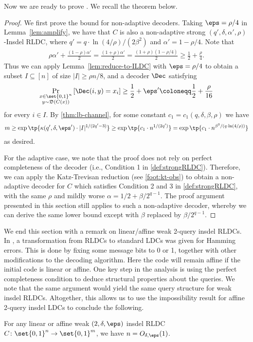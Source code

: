 Now we are ready to prove . We recall the theorem below.
\strirldcmain*
\begin{proof}
We first prove the bound for non-adaptive decoders. Taking $\eps = \rho/4$ in Lemma~\ref{lem:amplify}, we have that $C$ is also a non-adaptive strong $(q',\delta,\alpha', \rho)$-Insdel RLDC, where $q'=q\cdot \ln(4/\rho)/(2\beta^2)$ and $\alpha'=1-\rho/4$. Note that
\begin{align*}
	\rho\alpha' + \frac{(1-\rho)\alpha'}{2} = \frac{(1+\rho)\alpha'}{2} = \frac{(1+\rho)(1-\rho/4)}{2} \ge \frac{1}{2} + \frac{\rho}{4}.
\end{align*}
Thus we can apply Lemma~\ref{lem:reduce-to-ILDC} with $\eps = \rho/4$ to obtain a subset $I\subseteq [n]$ of size $|I| \ge \rho n/8$, and a decoder $\Dec$ satisfying
\begin{align*}
	\Pr_{\substack{x \in \set{0,1}^n \\ y \sim \mathfrak{D}(C(x))}}\left[ \Dec(i, y) = x_i \right] \ge \frac{1}{2} + \eps' \coloneqq \frac{1}{2}+\frac{\rho}{16} 
\end{align*}
for every $i \in I$. By \cref{thm:lb-channel}, for some constant $c_1=c_1(q,\delta,\beta,\rho)$ we have 
\begin{align*}
m \ge \exp\tp{\kappa(q',\delta,\eps') \cdot |I|^{1/(2q'-3)}} \ge \exp\tp{c_1 \cdot n^{1/(2q')}} = \exp\tp{c_1\cdot n^{\beta^2/(q \cdot \ln(4/\rho))}}
\end{align*}
as desired. 

For the adaptive case, we note that the proof does not rely on perfect completeness of the decoder (i.e., Condition 1 in \cref{def:strongRLDC}). Therefore, we can apply the Katz-Trevisan reduction (see \cref{foot:kt-obs}) to obtain a non-adaptive decoder for $C$ which satisfies Condition 2 and 3 in \cref{def:strongRLDC}, with the same $\rho$ and mildly worse $\alpha=1/2+\beta/2^{q-1}$. The proof argument presented in this section still applies to such a non-adaptive decoder, whereby we can derive the same lower bound except with $\beta$ replaced by $\beta/2^{q-1}$.
\end{proof}

We end this section with a remark on linear/affine weak 2-query insdel RLDCs. In , a transformation from RLDCs to standard LDCs was given for Hamming errors. This is done by fixing some message bits to 0 or 1, together with other modifications to the decoding algorithm. Here the code will remain affine if the initial code is linear or affine. One key step in the analysis is using the perfect completeness condition to deduce structural properties about the queries. We note that the same argument would yield the same query structure for weak insdel RLDCs. Altogether, this allows us to use the impossibility result for affine 2-query insdel LDCs \cite{blocki2021exponential} to conclude the following.
\begin{corollary} \label{cor:linear-2qIRLDC}
For any linear or affine weak $(2,\delta,\eps)$ insdel RLDC $C \colon \set{0,1}^n \rightarrow \set{0,1}^m$, we have $n=O_{\delta,\eps}(1)$.
\end{corollary}

